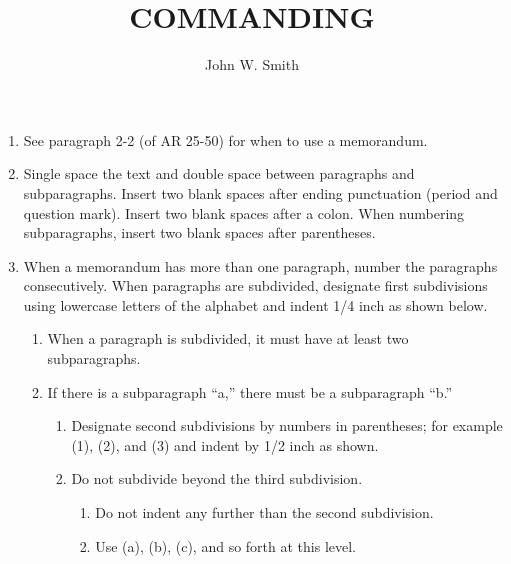 \documentclass[digsig]{../armymemo}
\author{John W. Smith}\rank{CPT}\branch{CY}
\title{COMMANDING}                                                %
\begin{document}
\begin{enumerate}
\item See paragraph 2-2 (of AR 25-50) for when to use a memorandum.
\item Single space the text and double space between paragraphs and subparagraphs. Insert two blank spaces after ending punctuation (period and question mark). Insert two blank spaces after a colon. When numbering subparagraphs, insert two blank spaces after parentheses.
\item When a memorandum has more than one paragraph, number the paragraphs consecutively. When paragraphs are subdivided, designate first subdivisions using lowercase letters of the alphabet and indent 1/4 inch as shown below.
  \begin{enumerate}
  \item When a paragraph is subdivided, it must have at least two subparagraphs.
  \item If there is a subparagraph ``a,'' there must be a subparagraph ``b.''
    \begin{enumerate}
    \item Designate second subdivisions by numbers in parentheses; for example (1), (2), and (3) and indent by 1/2 inch as shown.
    \item Do not subdivide beyond the third subdivision.
      \begin{enumerate}
      \item Do not indent any further than the second subdivision.
      \item Use (a), (b), (c), and so forth at this level.
      \end{enumerate}
    \end{enumerate}
  \end{enumerate}
\end{enumerate}
\end{document}
